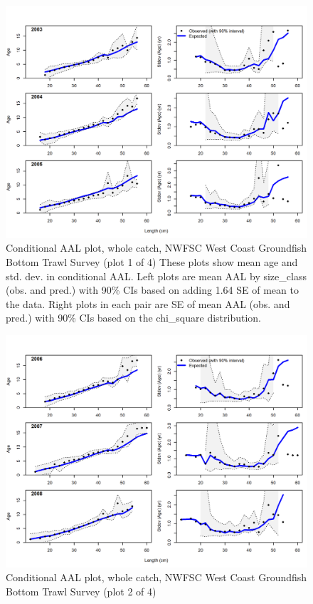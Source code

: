 \documentclass[12pt,]{article}
\begin{document}
\begin{figure}
\centering
\includegraphics{r4ss/plots_mod1/comp_condAALfit_Andre_plotsflt7mkt0_page1.png}
\caption{Conditional AAL plot, whole catch, NWFSC West Coast Groundfish
Bottom Trawl Survey (plot 1 of 4) These plots show mean age and std.
dev. in conditional AAL. Left plots are mean AAL by size\_class (obs.
and pred.) with 90\% CIs based on adding 1.64 SE of mean to the data.
Right plots in each pair are SE of mean AAL (obs. and pred.) with 90\%
CIs based on the chi\_square distribution.
\label{fig:nwfsc_combo_andre_1}}
\end{figure}

\begin{figure}
\centering
\includegraphics{r4ss/plots_mod1/comp_condAALfit_Andre_plotsflt7mkt0_page2.png}
\caption{Conditional AAL plot, whole catch, NWFSC West Coast Groundfish
Bottom Trawl Survey (plot 2 of 4) \label{fig:nwfsc_combo_andre_2}}
\end{figure}
\end{document}
